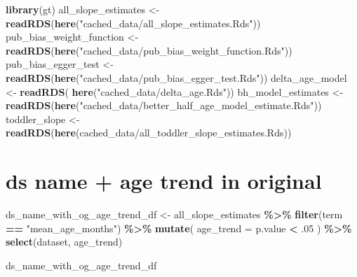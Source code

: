 \documentclass[
]{article}
\newenvironment{Shaded}{\begin{snugshade}}{\end{snugshade}}
\newcommand{\AttributeTok}[1]{\textcolor[rgb]{0.13,0.29,0.53}{#1}}
\newcommand{\DecValTok}[1]{\textcolor[rgb]{0.00,0.00,0.81}{#1}}
\newcommand{\FunctionTok}[1]{\textcolor[rgb]{0.13,0.29,0.53}{\textbf{#1}}}
\newcommand{\NormalTok}[1]{#1}
\newcommand{\OtherTok}[1]{\textcolor[rgb]{0.56,0.35,0.01}{#1}}
\newcommand{\SpecialCharTok}[1]{\textcolor[rgb]{0.81,0.36,0.00}{\textbf{#1}}}
\newcommand{\StringTok}[1]{\textcolor[rgb]{0.31,0.60,0.02}{#1}}
\begin{document}
\begin{Shaded}
\begin{Highlighting}[]
\FunctionTok{library}\NormalTok{(gt)}
\NormalTok{all\_slope\_estimates }\OtherTok{\textless{}{-}} \FunctionTok{readRDS}\NormalTok{(}\FunctionTok{here}\NormalTok{(}\StringTok{"cached\_data/all\_slope\_estimates.Rds"}\NormalTok{))}
\NormalTok{pub\_bias\_weight\_function }\OtherTok{\textless{}{-}} \FunctionTok{readRDS}\NormalTok{(}\FunctionTok{here}\NormalTok{(}\StringTok{"cached\_data/pub\_bias\_weight\_function.Rds"}\NormalTok{))}
\NormalTok{pub\_bias\_egger\_test }\OtherTok{\textless{}{-}} \FunctionTok{readRDS}\NormalTok{(}\FunctionTok{here}\NormalTok{(}\StringTok{"cached\_data/pub\_bias\_egger\_test.Rds"}\NormalTok{))}
\NormalTok{delta\_age\_model }\OtherTok{\textless{}{-}} \FunctionTok{readRDS}\NormalTok{( }\FunctionTok{here}\NormalTok{(}\StringTok{"cached\_data/delta\_age.Rds"}\NormalTok{))}
\NormalTok{bh\_model\_estimates }\OtherTok{\textless{}{-}} \FunctionTok{readRDS}\NormalTok{(}\FunctionTok{here}\NormalTok{(}\StringTok{"cached\_data/better\_half\_age\_model\_estimate.Rds"}\NormalTok{))}
\NormalTok{toddler\_slope }\OtherTok{\textless{}{-}} \FunctionTok{readRDS}\NormalTok{(}\FunctionTok{here}\NormalTok{(}\StringTok{\textquotesingle{}cached\_data/all\_toddler\_slope\_estimates.Rds\textquotesingle{}}\NormalTok{))}
\end{Highlighting}
\end{Shaded}

\hypertarget{ds-name-age-trend-in-original}{%
\section{ds name + age trend in
original}\label{ds-name-age-trend-in-original}}

\begin{Shaded}
\begin{Highlighting}[]
\NormalTok{ds\_name\_with\_og\_age\_trend\_df }\OtherTok{\textless{}{-}}\NormalTok{ all\_slope\_estimates }\SpecialCharTok{\%\textgreater{}\%} 
  \FunctionTok{filter}\NormalTok{(term }\SpecialCharTok{==} \StringTok{"mean\_age\_months"}\NormalTok{) }\SpecialCharTok{\%\textgreater{}\%} 
  \FunctionTok{mutate}\NormalTok{(}
    \AttributeTok{age\_trend =}\NormalTok{ p.value }\SpecialCharTok{\textless{}}\NormalTok{ .}\DecValTok{05}
\NormalTok{  ) }\SpecialCharTok{\%\textgreater{}\%} 
  \FunctionTok{select}\NormalTok{(dataset, age\_trend)}

\NormalTok{ds\_name\_with\_og\_age\_trend\_df}
\end{Highlighting}
\end{Shaded}
\end{document}
